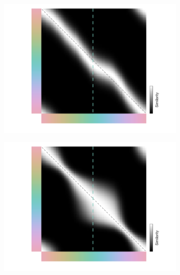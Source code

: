 \begin{figure}
    \begin{subfigure}[t]{0.3\textwidth}
         \centering
         \caption{}
         \includegraphics[width=\textwidth,trim={2cm 0.5cm 2 0},clip]{../Figures/working/F3_TCCModel/sm_og_231110-022722.png}
         \label{fig:TCCModel_og_sm}
    \end{subfigure}
    \begin{subfigure}[t]{0.3\textwidth}
         \centering
         \caption{}
         \includegraphics[width=\textwidth,trim={2cm 0.5cm 2 0},clip]{../Figures/working/F3_TCCModel/sm_ssnu_231110-022643.png}
         \label{fig:TCCModel_ssnu_sm}
    \end{subfigure}
    
    \begin{subfigure}[t]{0.3\textwidth}
         \centering
         \caption{}
         
         \label{fig:TCCModel_og_sf}
    \end{subfigure}
    \begin{subfigure}[t]{0.3\textwidth}
         \centering
         \caption{}
         
         \label{fig:TCCModel_ssnu_sf}
    \end{subfigure}


\end{figure}
